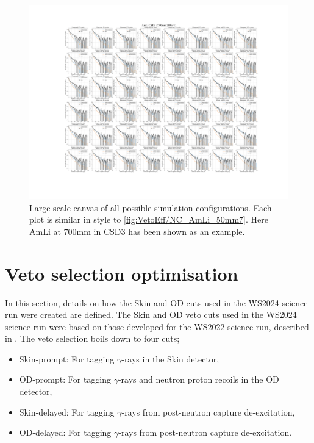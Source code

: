 \begin{figure}
	\centering
	\includegraphics[width=\linewidth]{figures/VetoEfficiency/AmLi_CSD3_Z700mm_200keV.png}
	\caption{Large scale canvas of all possible simulation configurations. Each plot is similar in style to \autoref{fig:VetoEff/NC_AmLi_50mm7}. Here AmLi at 700mm in CSD3 has been shown as an example.}
	\label{fig:VetoEff/NC_Canvas}
\end{figure}


\section{Veto selection optimisation}
In this section, details on how the Skin and OD cuts used in the WS2024 science run were created are defined. The Skin and OD veto cuts used in the WS2024 science run were based on those developed for the WS2022 science run, described in \cite{LZCollaboration:2024lux}.
The veto selection boils down to four cuts;
\begin{itemize}
	\item Skin-prompt: For tagging $\gamma$-rays in the Skin detector,
	\item OD-prompt: For tagging $\gamma$-rays and neutron proton recoils in the OD detector,
	\item Skin-delayed: For tagging $\gamma$-rays from post-neutron capture de-excitation,
	\item OD-delayed: For tagging $\gamma$-rays from post-neutron capture de-excitation.
\end{itemize}

